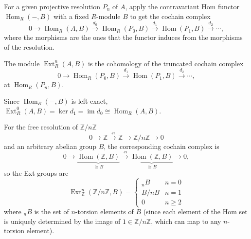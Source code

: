 \documentclass[10pt]{article}
\providecommand{\ZZ}{\mathbb Z}
\providecommand{\opname}{\operatorname}
\providecommand{\Ext}{\operatorname{Ext}}
\renewcommand{\hom}{\opname{Hom}}
\newcommand{\im}{\opname{im}}
\newcommand{\longto}{\longrightarrow}
\begin{document}
For a given projective resolution $P_n$ of $A$,
apply the contravariant Hom functor $\hom_R(-,B)$
with a fixed $R$-module $B$ to get the cochain complex
\begin{equation*}
    0\longto \hom_R(A,B)\overset{d_0}\longto\hom_R(P_0,B)
    \overset{d_1}\longto\hom(P_1,B)\overset{d_2}\longto\cdots,
\end{equation*}
where the morphisms are the ones that the functor induces
from the morphisms of the resolution.

\begin{definition}[Ext]
    \label{def:ext-def}
    The module $\Ext_R^n(A,B)$ is the cohomology
    of the truncated cochain complex
    \begin{equation*}
	0\longto\hom_R(P_0,B)
	\overset{d_1}\longto\hom(P_1,B)\overset{d_2}\longto\cdots,
    \end{equation*}
    at $\hom_R(P_n,B)$.
\end{definition}

\begin{example}
    Since $\hom_R(-,B)$ is left-exact,
    $\Ext_R^0(A,B) = \ker d_1 = \im d_0 \cong \hom_R(A,B)$.
\end{example}

\begin{example}
    For the free resolution of $\ZZ/n\ZZ$
    \begin{equation*}
	0\longto \ZZ\overset{\cdot n}\longto \ZZ\longto \ZZ/n\ZZ\longto 0
    \end{equation*}
    and an arbitrary abelian group $B$,
    the corresponding cochain complex is
    \begin{equation*}
	0\longto\underbrace{\hom(\ZZ,B)}_{\cong B}
	\overset{\cdot n}\longto\underbrace{\hom(\ZZ,B)}_{\cong B}\longto 0,
    \end{equation*}
    so the Ext groups are
    \begin{equation*}
        \Ext_\ZZ^n(\ZZ/n\ZZ,B) = \begin{cases}
	    {_n}B & n = 0\\
	    B/nB & n = 1\\
	    0 & n \ge 2
        \end{cases}
    \end{equation*}
    where ${_n}B$ is the set of $n$-torsion elements of $B$
    (since each element of the Hom set is uniquely determined
    by the image of $1\in\ZZ/n\ZZ$, which can map to any $n$-torsion element).
\end{example}
\end{document}
